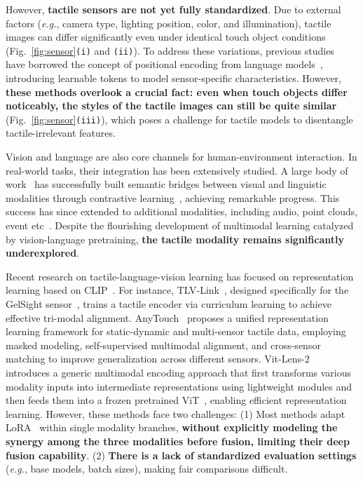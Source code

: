 \documentclass[letterpaper]{article} %
\theoremstyle{definition}                %
\theoremstyle{plain}                     %
\theoremstyle{remark}                    %
\begin{document}
However, \textbf{tactile sensors are not yet fully standardized}. Due to external factors (\textit{e.g.}, camera type, lighting position, color, and illumination), tactile images can differ significantly even under identical touch object conditions (Fig.~\ref{fig:sensor}\texttt{(i)} and \texttt{(ii)}). To address these variations, previous studies~\cite{yang2024binding, feng2025anytouch} have borrowed the concept of positional encoding from language models~\cite{su2024roformer, zhao2024length, jiang2025purekv}, introducing learnable tokens to model sensor-specific characteristics. However, \textbf{these methods overlook a crucial fact: even when touch objects differ noticeably, the styles of the tactile images can still be quite similar} (Fig.~\ref{fig:sensor}\texttt{(iii)}), which poses a challenge for tactile models to disentangle tactile-irrelevant features.

Vision and language are also core channels for human-environment interaction. In real-world tasks, their integration has been extensively studied. A large body of work~\cite{radford2021learning, lv2025debiased, jia2021scaling, alayrac2022flamingo, li2023scaling} has successfully built semantic bridges between visual and linguistic modalities through contrastive learning~\cite{oord2018representation}, achieving remarkable progress. This success has since extended to additional modalities, including audio, point clouds, event etc~\cite{girdhar2023imagebind, guo2023point, wang2024omnibind, lyu2024unibind}. Despite the flourishing development of multimodal learning catalyzed by vision-language pretraining, \textbf{the tactile modality remains significantly underexplored}.

Recent research on tactile-language-vision learning has focused on representation learning based on CLIP~\cite{radford2021learning, cherti2023reproducible}. For instance, TLV-Link~\cite{cheng2025touch100k}, designed specifically for the GelSight sensor~\cite{yuan2017gelsight}, trains a tactile encoder via curriculum learning to achieve effective tri-modal alignment. AnyTouch~\cite{feng2025anytouch} proposes a unified representation learning framework for static-dynamic and multi-sensor tactile data, employing masked modeling, self-supervised multimodal alignment, and cross-sensor matching to improve generalization across different sensors. Vit-Lens-2~\cite{lei2024vit} introduces a generic multimodal encoding approach that first transforms various modality inputs into intermediate representations using lightweight modules and then feeds them into a frozen pretrained ViT~\cite{dosovitskiy2020image}, enabling efficient representation learning.
However, these methods face two challenges: (1) Most methods adapt LoRA~\cite{hu2022lora, zhou2025cola} within single modality branches, \textbf{without explicitly modeling the synergy among the three modalities before fusion, limiting their deep fusion capability}. (2) \textbf{There is a lack of standardized evaluation settings} (\textit{e.g.}, base models, batch sizes), making fair comparisons difficult.
\end{document}
